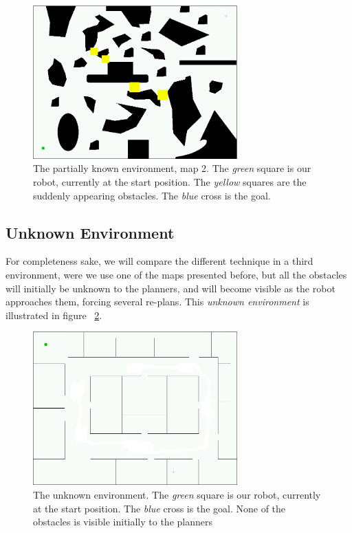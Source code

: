 \begin{figure}[h!]
\begin{center}
\includegraphics[width=0.7\textwidth]{images/800-partial}
\caption[The partially known environment, map 2]{The partially known environment, map 2. The \emph{green} square is our robot,
currently at the start position. The \emph{yellow} squares are the suddenly
appearing obstacles. The \emph{blue} cross is the goal.}
\label{fig:800-partial}
\end{center}
\end{figure}

\subsection{Unknown Environment}

For completeness sake, we will compare the different technique in a third
environment, were we use one of  the maps presented before, but
all the obstacles will initially be unknown to the 
planners, and will become visible as the robot approaches them, forcing several
re-plans. This \emph{unknown environment} is illustrated in figure~%
\ref{fig:office-unknown}.


\begin{figure}[h!]
\begin{center}
\includegraphics[width=0.7\textwidth]{images/office-unknown}
\caption[The unknown environment]{The unknown environment. The \emph{green} square is our robot,
currently at the start position. The \emph{blue} cross is the goal. None of the
obstacles is visible initially to the planners}
\label{fig:office-unknown}
\end{center}
\end{figure}

